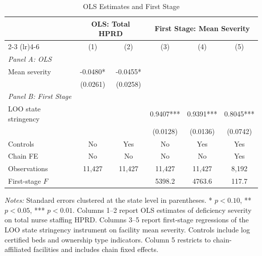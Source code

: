 \begin{table}[H]
\centering
\caption{OLS Estimates and First Stage}
\label{tab:ols_fs}
\begin{threeparttable}
\begin{tabular}{lccccc}
\toprule
& \multicolumn{2}{c}{OLS: Total HPRD} & \multicolumn{3}{c}{First Stage: Mean Severity} \\
\cmidrule(lr){2-3} \cmidrule(lr){4-6}
& (1) & (2) & (3) & (4) & (5) \\
\midrule
\multicolumn{6}{l}{\textit{Panel A: OLS}} \\[3pt]
Mean severity & -0.0480* & -0.0455* & & & \\
& (0.0261) & (0.0258) & & & \\[6pt]
\multicolumn{6}{l}{\textit{Panel B: First Stage}} \\[3pt]
LOO state stringency & & & 0.9407*** & 0.9391*** & 0.8045*** \\
& & & (0.0128) & (0.0136) & (0.0742) \\[6pt]
\midrule
Controls & No & Yes & No & Yes & Yes \\
Chain FE & No & No & No & No & Yes \\
Observations & 11,427 & 11,427 & 11,427 & 11,427 & 8,192 \\
First-stage $F$ & & & 5398.2 & 4763.6 & 117.7 \\
\bottomrule
\end{tabular}
\begin{tablenotes}[flushleft]
\small
\item \textit{Notes:} Standard errors clustered at the state level in parentheses.
* $p<0.10$, ** $p<0.05$, *** $p<0.01$.
Columns 1--2 report OLS estimates of deficiency severity on total nurse staffing HPRD.
Columns 3--5 report first-stage regressions of the LOO state stringency instrument on
facility mean severity. Controls include log certified beds and ownership type indicators.
Column 5 restricts to chain-affiliated facilities and includes chain fixed effects.
\end{tablenotes}
\end{threeparttable}
\end{table}
